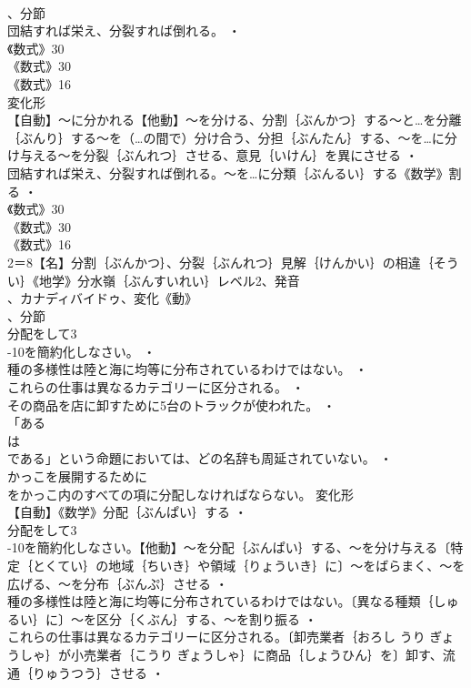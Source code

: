 \documentclass[8pt]{extreport}
\begin{document}
\begin{CJK}{UTF8}{min}
\\	、分節
\\	団結すれば栄え、分裂すれば倒れる。 ・
\\	《数式》30
\\	《数式》30
\\	《数式》16
\\	変化形 
\\	【自動】～に分かれる【他動】～を分ける、分割｛ぶんかつ｝する～と…を分離｛ぶんり｝する～を（…の間で）分け合う、分担｛ぶんたん｝する、～を…に分け与える～を分裂｛ぶんれつ｝させる、意見｛いけん｝を異にさせる ・
\\	団結すれば栄え、分裂すれば倒れる。～を…に分類｛ぶんるい｝する《数学》割る ・
\\	《数式》30
\\	《数式》30
\\	《数式》16
\\	2＝8【名】分割｛ぶんかつ｝、分裂｛ぶんれつ｝見解｛けんかい｝の相違｛そうい｝《地学》分水嶺｛ぶんすいれい｝レベル2、発音
\\	、カナディバイドゥ、変化《動》
\\	、分節
\\	分配をして3
\\	-10を簡約化しなさい。 ・
\\	種の多様性は陸と海に均等に分布されているわけではない。 ・
\\	これらの仕事は異なるカテゴリーに区分される。 ・
\\	その商品を店に卸すために5台のトラックが使われた。 ・
\\	「ある
\\	は
\\	である」という命題においては、どの名辞も周延されていない。 ・
\\	かっこを展開するために
\\	をかっこ内のすべての項に分配しなければならない。	変化形 
\\	【自動】《数学》分配｛ぶんぱい｝する ・
\\	分配をして3
\\	-10を簡約化しなさい。【他動】～を分配｛ぶんぱい｝する、～を分け与える〔特定｛とくてい｝の地域｛ちいき｝や領域｛りょういき｝に〕～をばらまく、～を広げる、～を分布｛ぶんぷ｝させる ・
\\	種の多様性は陸と海に均等に分布されているわけではない。〔異なる種類｛しゅるい｝に〕～を区分｛くぶん｝する、～を割り振る ・
\\	これらの仕事は異なるカテゴリーに区分される。〔卸売業者｛おろし うり ぎょうしゃ｝が小売業者｛こうり ぎょうしゃ｝に商品｛しょうひん｝を〕卸す、流通｛りゅうつう｝させる ・

\end{CJK}
\end{document}
